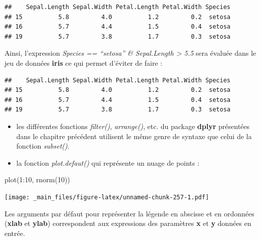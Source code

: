 \documentclass[
]{book}
\newenvironment{Shaded}{\begin{snugshade}}{\end{snugshade}}
\newcommand{\DecValTok}[1]{\textcolor[rgb]{0.00,0.00,0.81}{#1}}
\newcommand{\FloatTok}[1]{\textcolor[rgb]{0.00,0.00,0.81}{#1}}
\newcommand{\FunctionTok}[1]{\textcolor[rgb]{0.00,0.00,0.00}{#1}}
\newcommand{\NormalTok}[1]{#1}
\newcommand{\SpecialCharTok}[1]{\textcolor[rgb]{0.00,0.00,0.00}{#1}}
\newcommand{\StringTok}[1]{\textcolor[rgb]{0.31,0.60,0.02}{#1}}
\theoremstyle{definition}
\theoremstyle{definition}
\theoremstyle{definition}
\theoremstyle{definition}
\theoremstyle{remark}
\begin{document}
\begin{verbatim}
##    Sepal.Length Sepal.Width Petal.Length Petal.Width Species
## 15          5.8         4.0          1.2         0.2  setosa
## 16          5.7         4.4          1.5         0.4  setosa
## 19          5.7         3.8          1.7         0.3  setosa
\end{verbatim}

Ainsi, l'expression \emph{Species == ``setosa'' \& Sepal.Length \textgreater{} 5.5} sera évaluée dans le jeu de données \textbf{iris} ce qui permet d'éviter de faire :

\begin{Shaded}
\end{Shaded}

\begin{verbatim}
##    Sepal.Length Sepal.Width Petal.Length Petal.Width Species
## 15          5.8         4.0          1.2         0.2  setosa
## 16          5.7         4.4          1.5         0.4  setosa
## 19          5.7         3.8          1.7         0.3  setosa
\end{verbatim}

\begin{itemize}
\item
  les différentes fonctions \emph{filter()}, \emph{arrange()}, etc. du package \textbf{dplyr} présentées dans le chapitre précédent utilisent le même genre de syntaxe que celui de la fonction \emph{subset()}.
\item
  la fonction \emph{plot.defaut()} qui représente un nuage de points :
\end{itemize}

\begin{Shaded}
\begin{Highlighting}[]
\FunctionTok{plot}\NormalTok{(}\DecValTok{1}\SpecialCharTok{:}\DecValTok{10}\NormalTok{, }\FunctionTok{rnorm}\NormalTok{(}\DecValTok{10}\NormalTok{))}
\end{Highlighting}
\end{Shaded}

\texttt{[image: \_main\_files/figure-latex/unnamed-chunk-257-1.pdf]}

Les arguments par défaut pour représenter la légende en abscisse et en ordonnées (\textbf{xlab} et \textbf{ylab}) correspondent aux expressions des paramètres \textbf{x} et \textbf{y} données en entrée.
\end{document}
